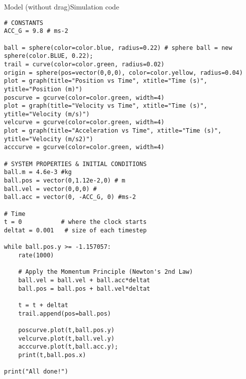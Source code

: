\begin{frame}[fragile]{Model (without drag)}{Simulation code}
\begin{multicols}{2}
\begin{verbatim}
# CONSTANTS
ACC_G = 9.8 # ms-2

ball = sphere(color=color.blue, radius=0.22) # sphere ball = new sphere(color.BLUE, 0.22);
trail = curve(color=color.green, radius=0.02)
origin = sphere(pos=vector(0,0,0), color=color.yellow, radius=0.04)
plot = graph(title="Position vs Time", xtitle="Time (s)", ytitle="Position (m)")
poscurve = gcurve(color=color.green, width=4)
plot = graph(title="Velocity vs Time", xtitle="Time (s)", ytitle="Velocity (m/s)")
velcurve = gcurve(color=color.green, width=4)
plot = graph(title="Acceleration vs Time", xtitle="Time (s)", ytitle="Velocity (m/s2)")
acccurve = gcurve(color=color.green, width=4)

# SYSTEM PROPERTIES & INITIAL CONDITIONS
ball.m = 4.6e-3 #kg
ball.pos = vector(0,1.12e-2,0) # m
ball.vel = vector(0,0,0) # 
ball.acc = vector(0, -ACC_G, 0) #ms-2

# Time
t = 0           # where the clock starts
deltat = 0.001   # size of each timestep

while ball.pos.y >= -1.157057:
    rate(1000)
    
    # Apply the Momentum Principle (Newton's 2nd Law)
    ball.vel = ball.vel + ball.acc*deltat
    ball.pos = ball.pos + ball.vel*deltat
    
    t = t + deltat
    trail.append(pos=ball.pos)

    poscurve.plot(t,ball.pos.y)
    velcurve.plot(t,ball.vel.y)
    acccurve.plot(t,ball.acc.y);
    print(t,ball.pos.x)

print("All done!")
\end{verbatim}
\end{multicols}
\end{frame}